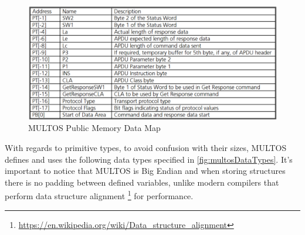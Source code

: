 \begin{figure}[bth]
	\begin{center}
		\includegraphics[width=\linewidth]{gfx/multosPubMem}
	\end{center}
	\caption{MULTOS Public Memory Data Map}
	\label{fig:multosPubMem}
\end{figure}


\hfil


With regards to primitive types, to avoid confusion with their sizes, MULTOS defines and uses the following data types specified in \autoref{fig:multosDataTypes}. It's important to notice that MULTOS is Big Endian
and when storing structures there is no padding between defined variables, unlike modern compilers that perform data structure alignment \footnote{\url{https://en.wikipedia.org/wiki/Data_structure_alignment}} for performance.

